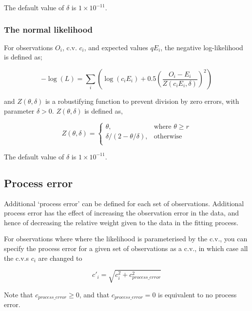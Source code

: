The default value of $\delta$ is $1 \times 10^{-11}$.

\subsubsection*{The normal likelihood}

For observations $O_i$, c.v. $c_i$, and expected values $qE_i$, the negative log-likelihood is defined as;

\begin{equation}
 - \log \left(L \right) = \sum\limits_i \left( \log \left( c_i E_i \right) +0.5 \left( \frac{O_i-E_i}{Z\left(c_i E_i,\delta \right)}\right)^2\right)
\end{equation}

and $Z \left(\theta,\delta \right)$ is a robustifying function to prevent division by zero errors, with parameter $\delta>0$. $Z \left(\theta,\delta \right)$ is defined as,

\begin{equation}
   Z \left(\theta,\delta \right) = \begin{cases}
	  \theta, & \text{where $\theta \ge r$} \\
	  \delta/\left( 2-\theta/\delta \right), & \text{otherwise} \\  
  \end{cases}
\end{equation}

The default value of $\delta$ is $1 \times 10^{-11}$.

\subsection{Process error}

Additional `process error' can be defined for each set of observations. Additional process error has the effect of increasing the observation error in the data, and hence of decreasing the relative weight given to the data in the fitting process. 

For observations where where the likelihood is parameterised by the c.v., you can specify the process error for a given set of observations as a c.v., in which case all the c.v.s $c_i$ are changed to

\begin{equation}
  c'_i  = \sqrt {c_i^2  + c_{process\_error}^2 } 
\end{equation}

Note that $c_{process\_ error} \ge 0$, and that $c_{process\_ error} = 0$ is equivalent to no process error.

